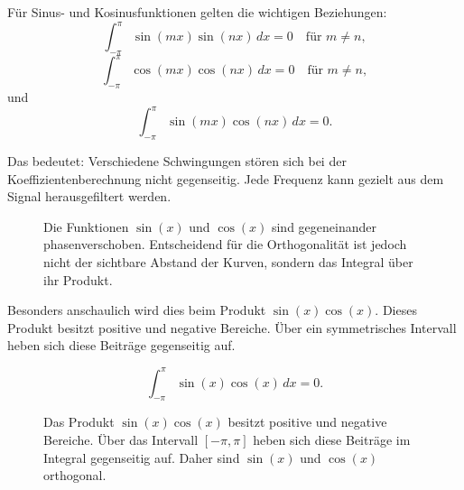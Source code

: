 Für Sinus- und Kosinusfunktionen gelten die wichtigen Beziehungen:
\[
\int_{-\pi}^{\pi} \sin(mx)\sin(nx)\,dx=0
\quad \text{für } m\neq n,
\]
\[
\int_{-\pi}^{\pi} \cos(mx)\cos(nx)\,dx=0
\quad \text{für } m\neq n,
\]
und
\[
\int_{-\pi}^{\pi} \sin(mx)\cos(nx)\,dx=0.
\]

Das bedeutet:
Verschiedene Schwingungen stören sich bei der Koeffizientenberechnung nicht gegenseitig.
Jede Frequenz kann gezielt aus dem Signal herausgefiltert werden.

\begin{figure}[htbp]
	\centering
	\caption{Die Funktionen $\sin(x)$ und $\cos(x)$ sind gegeneinander phasenverschoben.
		Entscheidend für die Orthogonalität ist jedoch nicht der sichtbare Abstand der Kurven,
		sondern das Integral über ihr Produkt.}
	\label{fig:sin_cos_orthogonalitaet}
\end{figure}

Besonders anschaulich wird dies beim Produkt \(\sin(x)\cos(x)\).
Dieses Produkt besitzt positive und negative Bereiche.
Über ein symmetrisches Intervall heben sich diese Beiträge gegenseitig auf.

\[
\int_{-\pi}^{\pi}\sin(x)\cos(x)\,dx=0.
\]

\begin{figure}[htbp]
	\centering
	\caption{Das Produkt $\sin(x)\cos(x)$ besitzt positive und negative Bereiche.
		Über das Intervall $[-\pi,\pi]$ heben sich diese Beiträge im Integral gegenseitig auf.
		Daher sind $\sin(x)$ und $\cos(x)$ orthogonal.}
	\label{fig:sin_cos_produkt}
\end{figure}

